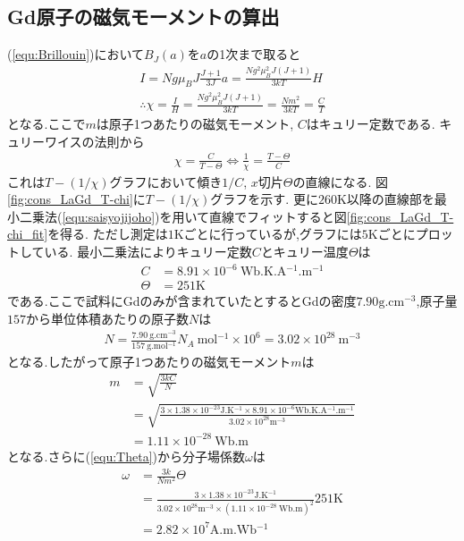 \subsection{Gd原子の磁気モーメントの算出}
(\ref{equ:Brillouin})において$B_J(a)$を$a$の1次まで取ると
\begin{align}
  \label{equ:cons_C-m}
  I=Ng\mu_BJ\frac{J+1}{3J}a=\frac{Ng^2\mu_B^2J(J+1)}{3kT}H\nonumber\\
  \therefore\chi=\frac{I}{H}=\frac{Ng^2\mu_B^2J(J+1)}{3kT}=\frac{Nm^2}{3kT}=\frac{C}{T}
\end{align}
となる.ここで$m$は原子1つあたりの磁気モーメント, $C$はキュリー定数である.
キュリーワイスの法則から
\begin{align}
  \chi=\frac{C}{T-\Theta}\Leftrightarrow\frac{1}{\chi}=\frac{T-\Theta}{C}
\end{align}
これは$T-(1/\chi)$グラフにおいて傾き$1/C$, $x$切片$\Theta$の直線になる.
図\ref{fig:cons_LaGd_T-chi}に$T-(1/\chi)$グラフを示す.
更に$260\si{\kelvin}$以降の直線部を最小二乗法(\ref{equ:saisyojijoho})を用いて直線でフィットすると図\ref{fig:cons_LaGd_T-chi_fit}を得る.
ただし測定は$1\si{\kelvin}$ごとに行っているが,グラフには$5\si{\kelvin}$ごとにプロットしている.
最小二乗法によりキュリー定数$C$とキュリー温度$\Theta$は
\begin{align}
  C&=8.91\times10^{-6}\ \si{\weber.\kelvin.\ampere^{-1}.\metre^{-1}}\\
  \Theta&=251\si{\kelvin}
\end{align}
である.ここで試料にGdのみが含まれていたとするとGdの密度$7.90\si{\gram.\centi\metre^{-3}}$,原子量$157$から単位体積あたりの原子数$N$は
\begin{align}
  N=\frac{7.90\ \si{\gram.\centi\metre^{-3}}}{157\ \si{\gram.\mole^{-1}}}N_A\ \si{\mole^{-1}}\times10^6=3.02\times10^{28}\ \si{\metre^{-3}}
\end{align}
となる\cite{alma990008542450204034}.したがって原子1つあたりの磁気モーメント$m$は
\begin{align}
  m&=\sqrt{\frac{3kC}{N}}\nonumber\\
  &=\sqrt{\frac{3\times1.38\times10^{-23}\si{\joule.\kelvin^{-1}} \times8.91\times10^{-6}\si{\weber.\kelvin.\ampere^{-1}.\metre^{-1}}}{3.02\times10^{28}\si{\metre^{-3}}}}\nonumber\\
  &=1.11\times10^{-28}\ \si{\weber.\metre}
\end{align}
となる.さらに(\ref{equ:Theta})から分子場係数$\omega$は
\begin{align}
  \omega&=\frac{3k}{Nm^2}\Theta\nonumber\\
  &=\frac{3\times1.38\times10^{-23}\si{\joule.\kelvin^{-1}}}{3.02\times10^{28}\si{\metre^{-3}}\times\left(1.11\times10^{-28}\ \si{\weber.\metre}\right)^2}251\si{\kelvin}\nonumber\\
  &=2.82\times10^7\si{\ampere.\metre.\weber^{-1}}
\end{align}
